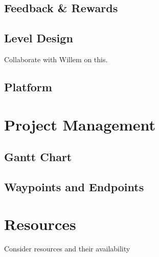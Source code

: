 \documentclass[a4paper]{article}
\begin{document}
\subsection{Feedback \& Rewards}

\subsection{Level Design}
Collaborate with Willem on this.

\subsection{Platform}


\section{Project Management} %
\subsection{Gantt Chart}
\subsection{Waypoints and Endpoints}

\section{Resources} %
Consider resources and their availability

\newpage
\printbibliography
\end{document}
